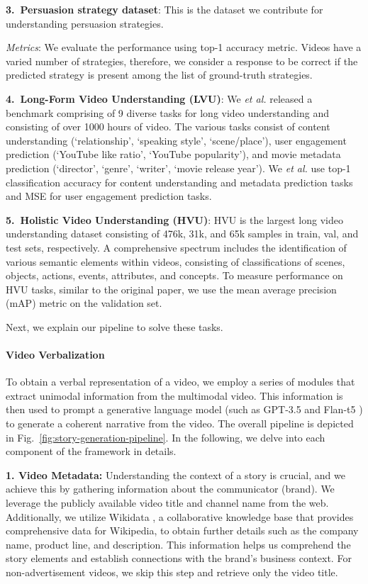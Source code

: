 \textbf{3.~Persuasion strategy dataset}: This is the dataset we contribute for understanding persuasion strategies.

\textit{Metrics}: We evaluate the performance using top-1 accuracy metric. Videos have a varied number of strategies, therefore, we consider a response to be correct if the predicted strategy is present among the list of ground-truth strategies.


\textbf{4.~Long-Form Video Understanding (LVU)}: We \textit{et al.} \cite{wu2021towards} released a benchmark comprising of 9 diverse tasks for long video understanding and consisting of over 1000 hours of video. The various tasks consist of content understanding (`relationship', `speaking style', `scene/place'), user engagement prediction (`YouTube like ratio', `YouTube popularity'), and movie metadata prediction (`director', `genre', `writer', `movie release year'). We \textit{et al.} \cite{wu2021towards} use top-1 classification accuracy for content understanding and metadata prediction tasks and MSE for user engagement prediction tasks.


\textbf{5.~Holistic Video Understanding (HVU)}: 
HVU \cite{diba2020large} is the largest long video understanding dataset consisting of 476k, 31k, and 65k samples in train, val, and test sets, respectively. A comprehensive spectrum includes the identification of various semantic elements within videos, consisting of classifications of scenes, objects, actions, events, attributes, and concepts. To measure performance on HVU tasks, similar to the original paper, we use the mean average precision (mAP) metric on the validation set.



Next, we explain our pipeline to solve these tasks.

\paragraph{Video Verbalization} 
To obtain a verbal representation of a video, we employ a series of modules that extract unimodal information from the multimodal video. This information is then used to prompt a generative language model (such as GPT-3.5 \cite{brown2020language} and Flan-t5 \cite{chung2022scaling}) to generate a coherent narrative from the video. The overall pipeline is depicted in Fig.~\ref{fig:story-generation-pipeline}. In the following, we delve into each component of the framework in details.

\noindent \textbf{1. Video Metadata:} Understanding the context of a story is crucial, and we achieve this by gathering information about the communicator (brand). We leverage the publicly available video title and channel name from the web. Additionally, we utilize Wikidata \cite{10.1145/2629489}, a collaborative knowledge base that provides comprehensive data for Wikipedia, to obtain further details such as the company name, product line, and description. This information helps us comprehend the story elements and establish connections with the brand's business context. For non-advertisement videos, we skip this step and retrieve only the video title.

